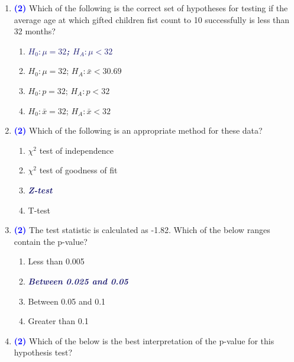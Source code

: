 \documentclass[11pt]{article}
\newcommand{\solnMult}[1]{\textbf{\textcolor{MidnightBlue}{\textit{#1}}}}	%
\newcommand{\pts}[1]{ \textbf{{\footnotesize \textcolor{blue}{(#1)}}} }	%
\begin{document}
\begin{enumerate}
\item \pts{2} \label{countF} Which of the following is the correct set of hypotheses for testing if the average age at which gifted children fist count to 10 successfully is less than 32 months?

\begin{multicols}{2}
\begin{enumerate}
\item \solnMult{$H_0: \mu = 32$; $H_A: \mu < 32$}
\item $H_0: \mu = 32$; $H_A: \bar{x} < 30.69$
\item $H_0: p = 32$; $H_A: p < 32$
\item $H_0: \bar{x} = 32$; $H_A: \bar{x} < 32$
\end{enumerate}
\end{multicols}

\item \pts{2} Which of the following is an appropriate method for these data?

\begin{multicols}{2}
\begin{enumerate}
\item $\chi^2$ test of independence
\item $\chi^2$ test of goodness of fit
\item \solnMult{Z-test}
\item {T-test}
\end{enumerate}
\end{multicols}

\item \pts{2} The test statistic is calculated as -1.82. Which of the below ranges contain the p-value?

\begin{multicols}{2}
\begin{enumerate}
\item Less than 0.005
\item \solnMult{Between 0.025 and 0.05}
\item Between 0.05 and 0.1
\item Greater than 0.1
\end{enumerate}
\end{multicols}

\item \pts{2}  \label{countL} Which of the below is the best interpretation of the p-value for this hypothesis test?


\end{enumerate}
\end{document}
